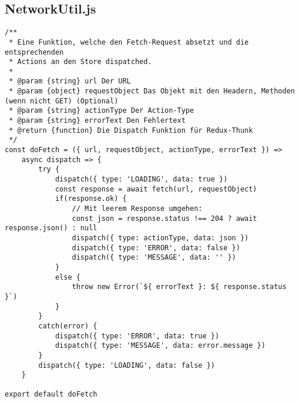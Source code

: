 \subsection{NetworkUtil.js}
\begin{verbatim}
/**
 * Eine Funktion, welche den Fetch-Request absetzt und die entsprechenden
 * Actions an den Store dispatched.
 * 
 * @param {string} url Der URL
 * @param {object} requestObject Das Objekt mit den Headern, Methoden (wenn nicht GET) (Optional)
 * @param {string} actionType Der Action-Type
 * @param {string} errorText Den Fehlertext
 * @return {function} Die Dispatch Funktion für Redux-Thunk
 */
const doFetch = ({ url, requestObject, actionType, errorText }) => 
    async dispatch => {
        try {
            dispatch({ type: 'LOADING', data: true })
            const response = await fetch(url, requestObject)
            if(response.ok) {
                // Mit leerem Response umgehen:
                const json = response.status !== 204 ? await response.json() : null
                dispatch({ type: actionType, data: json })
                dispatch({ type: 'ERROR', data: false })
                dispatch({ type: 'MESSAGE', data: '' })
            }
            else {
                throw new Error(`${ errorText }: ${ response.status }`)
            }
        }
        catch(error) {
            dispatch({ type: 'ERROR', data: true })
            dispatch({ type: 'MESSAGE', data: error.message })
        }
        dispatch({ type: 'LOADING', data: false })
    }

export default doFetch
\end{verbatim}